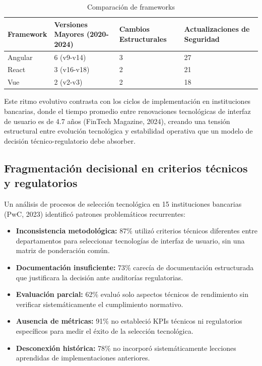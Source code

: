 \begin{table}[htbp]
\centering
\caption{Comparación de frameworks}
\label{tab:1.1}
\begin{tabularx}{\textwidth}{@{}lXXX@{}}
\toprule
Framework & Versiones Mayores (2020-2024) & Cambios Estructurales & Actualizaciones de Seguridad \\
\midrule
Angular & 6 (v9-v14)  & 3 & 27 \\
React   & 3 (v16-v18) & 2 & 21 \\
Vue     & 2 (v2-v3)   & 2 & 18 \\
\bottomrule
\end{tabularx}
\end{table}

Este ritmo evolutivo contrasta con los ciclos de implementación en
instituciones bancarias, donde el tiempo promedio entre renovaciones
tecnológicas de interfaz de usuario es de 4.7 años (FinTech Magazine, 2024),
creando una tensión estructural entre evolución tecnológica y estabilidad
operativa que un modelo de decisión técnico-regulatorio debe absorber.

\subsection*{Fragmentación decisional en criterios técnicos y regulatorios}

Un análisis de procesos de selección tecnológica en 15 instituciones bancarias
(PwC, 2023) identificó patrones problemáticos recurrentes:

\begin{itemize}
  \item \textbf{Inconsistencia metodológica:} 87\% utilizó criterios técnicos
        diferentes entre departamentos para seleccionar tecnologías de
        interfaz de usuario, sin una matriz de ponderación común.
  \item \textbf{Documentación insuficiente:} 73\% carecía de documentación
        estructurada que justificara la decisión ante auditorías regulatorias.
  \item \textbf{Evaluación parcial:} 62\% evaluó solo aspectos técnicos de
        rendimiento sin verificar sistemáticamente el cumplimiento normativo.
  \item \textbf{Ausencia de métricas:} 91\% no estableció KPIs técnicos ni
        regulatorios específicos para medir el éxito de la selección tecnológica.
  \item \textbf{Desconexión histórica:} 78\% no incorporó sistemáticamente
        lecciones aprendidas de implementaciones anteriores.
\end{itemize}

